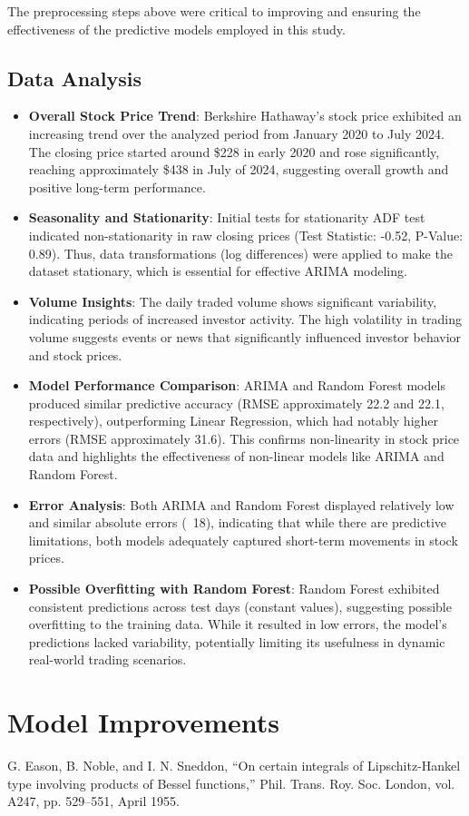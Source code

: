 \documentclass[conference]{IEEEtran}
\begin{document}
The preprocessing steps above were critical to improving and ensuring the effectiveness of the predictive models employed in this study.

\subsection{Data Analysis}\label{AA}
\begin{itemize}
    \item \textbf{Overall Stock Price Trend}: Berkshire Hathaway's stock price exhibited an increasing trend over the analyzed period from January 2020 to July 2024. The closing price started around \$228 in early 2020 and rose significantly, reaching approximately \$438 in July of 2024, suggesting overall growth and positive long-term performance.
    \item \textbf{Seasonality and Stationarity}: Initial tests for stationarity ADF test indicated non-stationarity in raw closing prices (Test Statistic: -0.52, P-Value: 0.89). Thus, data transformations (log differences) were applied to make the dataset stationary, which is essential for effective ARIMA modeling.
    \item \textbf{Volume Insights}: The daily traded volume shows significant variability, indicating periods of increased investor activity. The high volatility in trading volume suggests events or news that significantly influenced investor behavior and stock prices.
    \item \textbf{Model Performance Comparison}: ARIMA and Random Forest models produced similar predictive accuracy (RMSE approximately 22.2 and 22.1, respectively), outperforming Linear Regression, which had notably higher errors (RMSE approximately 31.6). This confirms non-linearity in stock price data and highlights the effectiveness of non-linear models like ARIMA and Random Forest.
    \item \textbf{Error Analysis}: Both ARIMA and Random Forest displayed relatively low and similar absolute errors (~18), indicating that while there are predictive limitations, both models adequately captured short-term movements in stock prices.
    \item \textbf{Possible Overfitting with Random Forest}: Random Forest exhibited consistent predictions across test days (constant values), suggesting possible overfitting to the training data. While it resulted in low errors, the model’s predictions lacked variability, potentially limiting its usefulness in dynamic real-world trading scenarios.
\end{itemize}



\section{Model Improvements}

\begin{thebibliography}{00}
 G. Eason, B. Noble, and I. N. Sneddon, ``On certain integrals of Lipschitz-Hankel type involving products of Bessel functions,'' Phil. Trans. Roy. Soc. London, vol. A247, pp. 529--551, April 1955.

\end{thebibliography}
\end{document}
